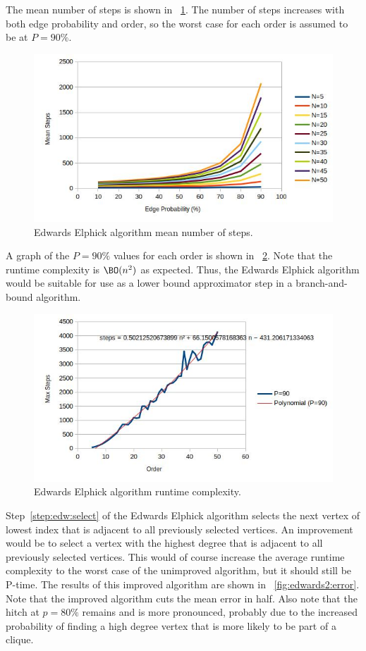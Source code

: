 The mean number of steps is shown in \figurename~\ref{fig:edwards1:steps}.  The number of steps increases with both
edge probability and order, so the worst case for each order is assumed to be at \(P=90\%\).

\begin{figure}[H]
  \centering
  \includegraphics[width=5in]{edwards1_steps}
  \caption{Edwards Elphick algorithm mean number of steps.}
  \label{fig:edwards1:steps}
\end{figure}

A graph of the \(P=90\%\) values for each order is shown in \figurename~\ref{fig:edwards1:runtime}.  Note that the
runtime complexity is \(\BO(n^2)\) as expected.  Thus, the Edwards Elphick algorithm would be suitable for use as a
lower bound approximator step in a branch-and-bound algorithm.

\begin{figure}[H]
  \centering
  \includegraphics[width=5in]{edwards1_runtime}
  \caption{Edwards Elphick algorithm runtime complexity.}
  \label{fig:edwards1:runtime}
\end{figure}

Step~\ref{step:edw:select} of the Edwards Elphick algorithm selects the next vertex of lowest index that is
adjacent to all previously selected vertices.  An improvement would be to select a vertex with the highest degree
that is adjacent to all previously selected vertices.  This would of course increase the average runtime complexity
to the worst case of the unimproved algorithm, but it should still be P-time.  The results of this improved
algorithm are shown in \figurename~\ref{fig:edwards2:error}.  Note that the improved algorithm cuts the mean error
in half.  Also note that the hitch at \(p=80\%\) remains and is more pronounced, probably due to the increased
probability of finding a high degree vertex that is more likely to be part of a clique.

